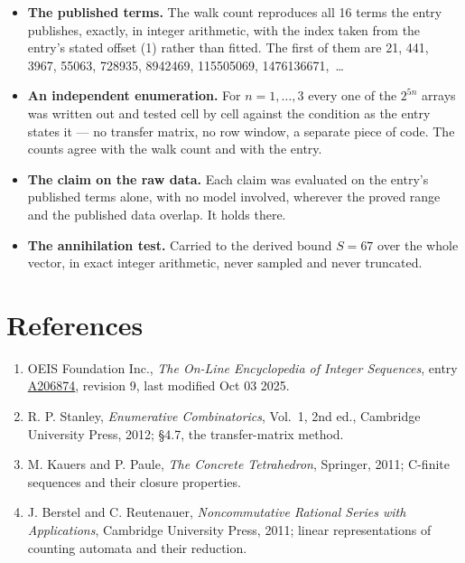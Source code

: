 \documentclass[11pt]{article}
\theoremstyle{definition}
\begin{document}
\begin{itemize}

\item {\bfseries The published terms.} The walk count reproduces all 16 terms the entry publishes, exactly, in integer arithmetic, with the index taken from the entry's stated offset (1) rather than fitted. The first of them are 21, 441, 3967, 55063, 728935, 8942469, 115505069, 1476136671,~\dots

\item {\bfseries An independent enumeration.} For $n = 1,\dots,3$ every one of the $2^{5n}$ arrays was written out and tested cell by cell against the condition as the entry states it --- no transfer matrix, no row window, a separate piece of code. The counts agree with the walk count and with the entry.

\item {\bfseries The claim on the raw data.} Each claim was evaluated on the entry's published terms alone, with no model involved, wherever the proved range and the published data overlap. It holds there.

\item {\bfseries The annihilation test.} Carried to the derived bound $S = 67$ over the whole vector, in exact integer arithmetic, never sampled and never truncated.

\end{itemize}

\section{References}

\begin{enumerate}

\item OEIS Foundation Inc., \emph{The On-Line Encyclopedia of Integer Sequences}, entry \href{https://oeis.org/A206874}{A206874}, revision 9, last modified Oct 03 2025.

\item R. P. Stanley, \emph{Enumerative Combinatorics}, Vol.~1, 2nd ed., Cambridge University Press, 2012; \S4.7, the transfer-matrix method.

\item M. Kauers and P. Paule, \emph{The Concrete Tetrahedron}, Springer, 2011; C-finite sequences and their closure properties.

\item J. Berstel and C. Reutenauer, \emph{Noncommutative Rational Series with Applications}, Cambridge University Press, 2011; linear representations of counting automata and their reduction.

\end{enumerate}
\end{document}
